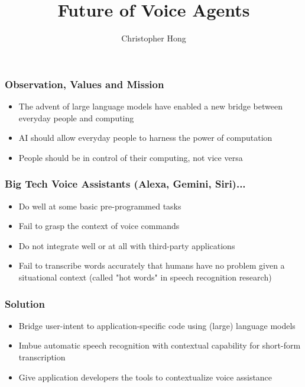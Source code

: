 \documentclass{beamer}
\title{Future of Voice Agents}
\author{Christopher Hong}
\newcommand{\cmark}{\ding{51}}%
\newcommand{\xmark}{\ding{55}}%
\newcommand{\done}{\item[\cmark]}
\newcommand{\crossed}{\item[\xmark]}
\begin{document}
\frame{\titlepage}

\begin{frame}
\frametitle{Observation, Values and Mission}
\begin{itemize}
    \item The advent of large language models have enabled a new bridge between everyday people and computing
    \item AI should allow everyday people to harness the power of computation
    \item People should be in control of their computing, not vice versa
\end{itemize}
\end{frame}

\begin{frame}
\frametitle{Big Tech Voice Assistants (Alexa, Gemini, Siri)...}
\begin{itemize}
    \done Do well at some basic pre-programmed tasks
    \crossed Fail to grasp the context of voice commands
    \crossed Do not integrate well or at all with third-party applications
    \crossed Fail to transcribe words accurately that humans have no problem given a situational context (called "hot words" in speech recognition research)
\end{itemize}
\end{frame}

\begin{frame}
\frametitle{Solution}
\begin{itemize}
    \item Bridge user-intent to application-specific code using (large) language models
    \item Imbue automatic speech recognition with contextual capability for short-form transcription
    \item Give application developers the tools to contextualize voice assistance
\end{itemize}
\end{frame}
\end{document}
